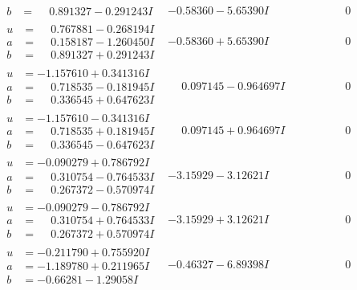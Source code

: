 \documentclass[1p]{elsarticle_modified}
\theoremstyle{definition}
\begin{document}
$$\begin{array}{c|c|c}
\begin{aligned}
b &= \phantom{-}0.891327 - 0.291243 I\end{aligned}
 & -0.58360 - 5.65390 I & \phantom{-0.000000 } 0 \\ \hline\begin{aligned}
u &= \phantom{-}0.767881 - 0.268194 I \\
a &= \phantom{-}0.158187 - 1.260450 I \\
b &= \phantom{-}0.891327 + 0.291243 I\end{aligned}
 & -0.58360 + 5.65390 I & \phantom{-0.000000 } 0 \\ \hline\begin{aligned}
u &= -1.157610 + 0.341316 I \\
a &= \phantom{-}0.718535 - 0.181945 I \\
b &= \phantom{-}0.336545 + 0.647623 I\end{aligned}
 & \phantom{-}0.097145 - 0.964697 I & \phantom{-0.000000 } 0 \\ \hline\begin{aligned}
u &= -1.157610 - 0.341316 I \\
a &= \phantom{-}0.718535 + 0.181945 I \\
b &= \phantom{-}0.336545 - 0.647623 I\end{aligned}
 & \phantom{-}0.097145 + 0.964697 I & \phantom{-0.000000 } 0 \\ \hline\begin{aligned}
u &= -0.090279 + 0.786792 I \\
a &= \phantom{-}0.310754 - 0.764533 I \\
b &= \phantom{-}0.267372 - 0.570974 I\end{aligned}
 & -3.15929 - 3.12621 I & \phantom{-0.000000 } 0 \\ \hline\begin{aligned}
u &= -0.090279 - 0.786792 I \\
a &= \phantom{-}0.310754 + 0.764533 I \\
b &= \phantom{-}0.267372 + 0.570974 I\end{aligned}
 & -3.15929 + 3.12621 I & \phantom{-0.000000 } 0 \\ \hline\begin{aligned}
u &= -0.211790 + 0.755920 I \\
a &= -1.189780 + 0.211965 I \\
b &= -0.66281 - 1.29058 I\end{aligned}
 & -0.46327 - 6.89398 I & \phantom{-0.000000 } 0 \\ \hline\begin{aligned}

\end{aligned}
\end{array}$$
\end{document}
